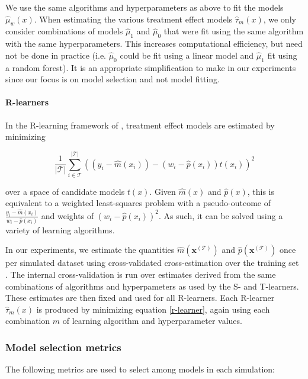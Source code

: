 We use the same algorithms and hyperparameters as above to fit the models $\hat\mu_w(x)$. When estimating the various treatment effect models $\hat\tau_m(x)$, we only consider combinations of models $\hat\mu_1$ and $\hat\mu_0$ that were fit using the same algorithm with the same hyperparameters. This increases computational efficiency, but need not be done in practice (i.e. $\hat\mu_0$ could be fit using a linear model and $\hat\mu_1$ fit using a random forest). It is an appropriate simplification to make in our experiments since our focus is on model selection and not model fitting.

\paragraph{R-learners} In the R-learning framework of \citet{Nie:2017vi}, treatment effect models are estimated by minimizing 

\begin{equation}
	\frac{1}{|\mathcal{T}|}\sum_{i \in \mathcal{T}}^{|\mathcal{T}|}  
	((y_i - \hat m(x_i)) - (w_i - \hat p(x_i))t(x_i))^2
\label{r-learner}
\end{equation}

over a space of candidate models $t(x)$. Given $\hat m(x)$ and $\hat p(x)$, this is equivalent to a weighted least-squares problem with a pseudo-outcome of $\frac{ y_i - \hat m(x_i) }{w_i - \hat p(x_i)}$ and weights of $(w_i - \hat p(x_i))^2$. As such, it can be solved using a variety of learning algorithms. 

In our experiments, we estimate the quantities $\hat m(\bm x^{(\mathcal T)})$ and $\hat p(\bm x^{(\mathcal T)})$ once per simulated dataset using cross-validated cross-estimation over the training set \cite{Nie:2017vi, Wager:2016dz}. The internal cross-validation is run over estimates derived from the same combinations of algorithms and hyperpameters as used by the S- and T-learners. These estimates are then fixed and used for all R-learners. Each R-learner $\hat\tau_m(x)$ is produced by minimizing equation \ref{r-learner}, again using each combination $m$ of learning algorithm and hyperparameter values.

\subsubsection{Model selection metrics}

The following metrics are used to select among models in each simulation:

